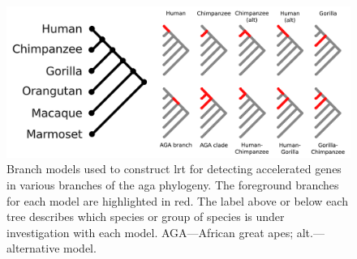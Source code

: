 \begin{figure}
\centering
\includegraphics[scale=0.5]{Figs/gorilla_branch_models.pdf}
\caption{Branch models used to construct \ac{lrt} for detecting
  accelerated genes in various branches of the \ac{aga} phylogeny. The
  foreground branches for each model are highlighted in red. The label
  above or below each tree describes which species or group of species
  is under investigation with each model. AGA---African great apes;
  alt.---alternative model.}
\label{fig_gorilla_branch_models}
\end{figure}

